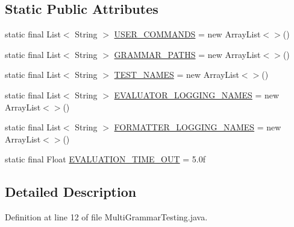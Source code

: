 \subsection*{Static Public Attributes}
\begin{DoxyCompactItemize}
\item 
static final List$<$ String $>$ \hyperlink{classit_1_1emarolab_1_1cagg_1_1example_1_1MultiGrammarTesting_a6cf319ea31fc0e18d4eb0fa17355f353}{U\-S\-E\-R\-\_\-\-C\-O\-M\-M\-A\-N\-D\-S} = new Array\-List$<$$>$()
\item 
static final List$<$ String $>$ \hyperlink{classit_1_1emarolab_1_1cagg_1_1example_1_1MultiGrammarTesting_a77a9e2e6e0c0dd1c6804ce68283ecfdc}{G\-R\-A\-M\-M\-A\-R\-\_\-\-P\-A\-T\-H\-S} = new Array\-List$<$$>$()
\item 
static final List$<$ String $>$ \hyperlink{classit_1_1emarolab_1_1cagg_1_1example_1_1MultiGrammarTesting_abe72f09d054c583771889d57e44a11a4}{T\-E\-S\-T\-\_\-\-N\-A\-M\-E\-S} = new Array\-List$<$$>$()
\item 
static final List$<$ String $>$ \hyperlink{classit_1_1emarolab_1_1cagg_1_1example_1_1MultiGrammarTesting_af6af5e77d9395aed73adf10844055c29}{E\-V\-A\-L\-U\-A\-T\-O\-R\-\_\-\-L\-O\-G\-G\-I\-N\-G\-\_\-\-N\-A\-M\-E\-S} = new Array\-List$<$$>$()
\item 
static final List$<$ String $>$ \hyperlink{classit_1_1emarolab_1_1cagg_1_1example_1_1MultiGrammarTesting_a09d8655f818d1fb229bfd3379608925f}{F\-O\-R\-M\-A\-T\-T\-E\-R\-\_\-\-L\-O\-G\-G\-I\-N\-G\-\_\-\-N\-A\-M\-E\-S} = new Array\-List$<$$>$()
\item 
static final Float \hyperlink{classit_1_1emarolab_1_1cagg_1_1example_1_1MultiGrammarTesting_a42d0af8d9a108af6c67e43eac1ee659e}{E\-V\-A\-L\-U\-A\-T\-I\-O\-N\-\_\-\-T\-I\-M\-E\-\_\-\-O\-U\-T} = 5.\-0f
\end{DoxyCompactItemize}


\subsection{Detailed Description}


Definition at line 12 of file Multi\-Grammar\-Testing.\-java.



